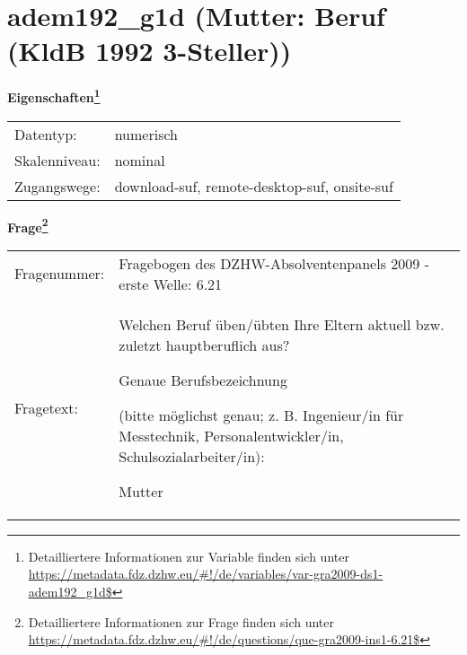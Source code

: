 
    \setcounter{footnote}{0}

    \vspace*{-1.8cm}
	\section{adem192\_g1d (Mutter: Beruf (KldB 1992 3-Steller))}
	\label{section:adem192_g1d}



    \vspace*{0.5cm}
    \noindent\textbf{Eigenschaften\footnote{Detailliertere Informationen zur Variable finden sich unter
		\url{https://metadata.fdz.dzhw.eu/\#!/de/variables/var-gra2009-ds1-adem192_g1d$}}}\\
	\begin{tabularx}{\hsize}{@{}lX}
	Datentyp: & numerisch \\
	Skalenniveau: & nominal \\
	Zugangswege: &
	  download-suf, 
	  remote-desktop-suf, 
	  onsite-suf
 \\
    \end{tabularx}



				\vspace*{0.5cm}
                \noindent\textbf{Frage\footnote{Detailliertere Informationen zur Frage finden sich unter
		              \url{https://metadata.fdz.dzhw.eu/\#!/de/questions/que-gra2009-ins1-6.21$}}}\\
				\begin{tabularx}{\hsize}{@{}lX}
					Fragenummer: &
					  Fragebogen des DZHW-Absolventenpanels 2009 - erste Welle:
					  6.21
 \\
					Fragetext: & Welchen Beruf üben/übten Ihre Eltern aktuell bzw. zuletzt hauptberuflich aus?\par  Genaue Berufsbezeichnung\par  (bitte möglichst genau; z. B. Ingenieur/in für Messtechnik, Personalentwickler/in, Schulsozialarbeiter/in):\par  Mutter \\
				\end{tabularx}





